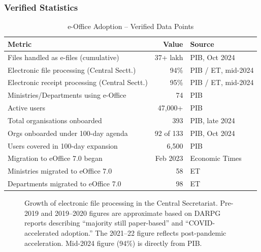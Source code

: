 \documentclass[12pt,a4paper]{article}
\begin{document}
\subsubsection{Verified Statistics}

\begin{table}[H]
\centering
\caption{e-Office Adoption  --  Verified Data Points}
\label{tab:eoffice}
\begin{tabular}{@{}p{7cm}rl@{}}
\toprule
\textbf{Metric} & \textbf{Value} & \textbf{Source} \\
\midrule
Files handled as e-files (cumulative) & 37+ lakh & PIB, Oct 2024 \\
Electronic file processing (Central Sectt.) & 94\% & PIB / ET, mid-2024 \\
Electronic receipt processing (Central Sectt.) & 95\% & PIB / ET, mid-2024 \\
Ministries/Departments using e-Office & 74 & PIB \\
Active users & 47,000+ & PIB \\
Total organisations onboarded & 393 & PIB, late 2024 \\
Orgs onboarded under 100-day agenda & 92 of 133 & PIB, Oct 2024 \\
Users covered in 100-day expansion & 6,500 & PIB \\
Migration to eOffice 7.0 began & Feb 2023 & Economic Times \\
Ministries migrated to eOffice 7.0 & 58 & ET \\
Departments migrated to eOffice 7.0 & 98 & ET \\
\bottomrule
\end{tabular}
\end{table}

\begin{figure}[H]
\centering
{}
\caption{Growth of electronic file processing in the Central Secretariat. Pre-2019 and 2019--2020 figures are approximate based on DARPG reports describing ``majority still paper-based'' and ``COVID-accelerated adoption.'' The 2021--22 figure reflects post-pandemic acceleration. Mid-2024 figure (94\%) is directly from PIB.}
\label{fig:eoffice_growth}
\end{figure}
\end{document}
